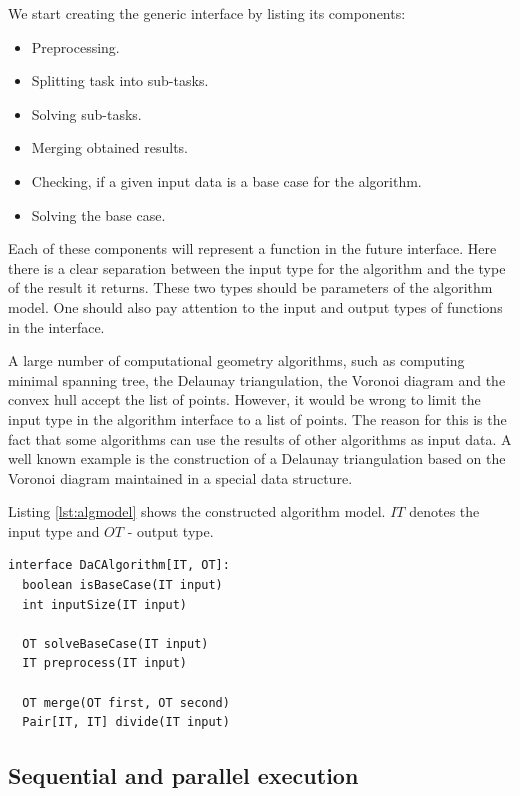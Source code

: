 \documentclass[conference]{IEEEtran}
\begin{document}
	We start creating the generic interface by listing its components:
	
	\begin{itemize}
		\item 
		Preprocessing.
		\item 
		Splitting task into sub-tasks.
		\item 
		Solving sub-tasks.
		\item 
		Merging obtained results.
		\item 
		Checking, if a given input data is a base case for the algorithm.
		\item 
		Solving the base case.
	\end{itemize}
	
	Each of these components will represent a function in the future interface. Here there is a clear separation between the input type for the algorithm and the type of the result it returns. These two types should be parameters of the algorithm model. One should also pay attention to the input and output types of functions  in the interface.
	
	A large number of computational geometry algorithms, such as computing minimal spanning tree, the Delaunay triangulation, the Voronoi diagram and the convex hull accept the list of points. However, it would be wrong to limit the input type in the algorithm interface to a list of points. The reason for this is the fact that some algorithms can use the results of other algorithms as input data. A well known example is the construction of a Delaunay triangulation based on the Voronoi diagram maintained in a special data structure.
	
	Listing \ref{lst:algmodel} shows the constructed algorithm model. $IT$ denotes the input type and $OT$ - output type.
	
		\begin{lstlisting}[caption={Algorithm model based on the ``divide-and-conquer'' principle},label={lst:algmodel},captionpos=b]
interface DaCAlgorithm[IT, OT]:
  boolean isBaseCase(IT input)
  int inputSize(IT input)
  
  OT solveBaseCase(IT input)
  IT preprocess(IT input)
  
  OT merge(OT first, OT second)
  Pair[IT, IT] divide(IT input)

		\end{lstlisting}

\subsection{Sequential and parallel execution}
	
\end{document}
